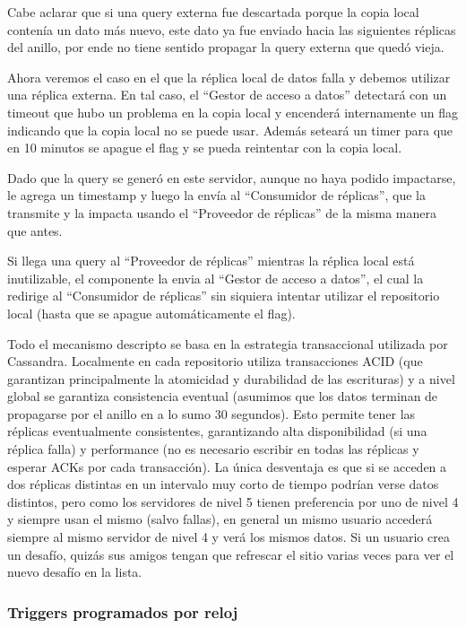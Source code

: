 Cabe aclarar que si una query externa fue descartada porque la copia local contenía un dato más nuevo, este dato ya fue enviado hacia las siguientes réplicas del anillo, por ende no tiene sentido propagar la query externa que quedó vieja.

Ahora veremos el caso en el que la réplica local de datos falla y debemos utilizar una réplica externa. En tal caso, el “Gestor de acceso a datos” detectará con un timeout que hubo un problema en la copia local y encenderá internamente un flag indicando que la copia local no se puede usar. Además seteará un timer para que en 10 minutos se apague el flag y se pueda reintentar con la copia local.

Dado que la query se generó en este servidor, aunque no haya podido impactarse, le agrega un timestamp y luego la envía al “Consumidor de réplicas”, que la transmite y la impacta usando el “Proveedor de réplicas” de la misma manera que antes.

Si llega una query al “Proveedor de réplicas” mientras la réplica local está inutilizable, el componente la envia al “Gestor de acceso a datos”, el cual la redirige al “Consumidor de réplicas” sin siquiera intentar utilizar el repositorio local (hasta que se apague automáticamente el flag).

Todo el mecanismo descripto se basa en la estrategia transaccional utilizada por Cassandra. Localmente en cada repositorio utiliza transacciones ACID (que garantizan principalmente la atomicidad y durabilidad de las escrituras) y a nivel global se garantiza consistencia eventual (asumimos que los datos terminan de propagarse por el anillo en a lo sumo 30 segundos). Esto permite tener las réplicas eventualmente consistentes, garantizando alta disponibilidad (si una réplica falla) y performance (no es necesario escribir en todas las réplicas y esperar ACKs por cada transacción). La única desventaja es que si se acceden a dos réplicas distintas en un intervalo muy corto de tiempo podrían verse datos distintos, pero como los servidores de nivel 5 tienen preferencia por uno de nivel 4 y siempre usan el mismo (salvo fallas), en general un mismo usuario accederá siempre al mismo servidor de nivel 4 y verá los mismos datos. Si un usuario crea un desafío, quizás sus amigos tengan que refrescar el sitio varias veces para ver el nuevo desafío en la lista.

\subsubsection{Triggers programados por reloj}

